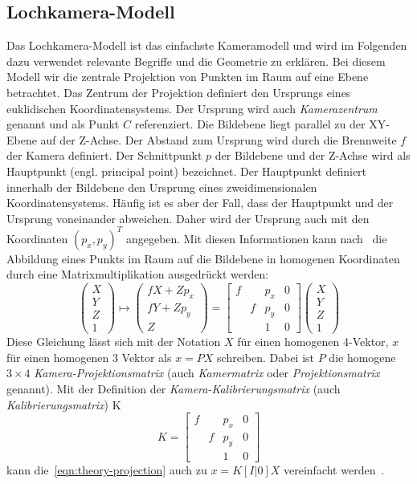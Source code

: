 \subsection{Lochkamera-Modell}\label{sec:pinhole-camera-model}
Das Lochkamera-Modell ist das einfachste Kameramodell und wird im Folgenden dazu verwendet relevante Begriffe und die Geometrie zu erklären.
Bei diesem Modell wir die zentrale Projektion von Punkten im Raum auf eine Ebene betrachtet.
Das Zentrum der Projektion definiert den Ursprungs eines euklidischen Koordinatensystems.
Der Ursprung wird auch \emph{Kamerazentrum} genannt und als Punkt $C$ referenziert.
Die Bildebene liegt parallel zu der XY-Ebene auf der Z-Achse.
Der Abstand zum Ursprung wird durch die Brennweite $f$ der Kamera definiert.
Der Schnittpunkt $p$ der Bildebene und der Z-Achse wird als Hauptpunkt (engl. principal point) bezeichnet.
Der Hauptpunkt definiert innerhalb der Bildebene den Ursprung eines zweidimensionalen Koordinatensystems.
Häufig ist es aber der Fall, dass der Hauptpunkt und der Ursprung voneinander abweichen.
Daher wird der Ursprung auch mit den Koordinaten $(p_x, p_y)^T$ angegeben.
Mit diesen Informationen kann nach~\cite[Gleichung 6.2]{hartley_2003} die Abbildung eines Punkts im Raum auf die Bildebene in homogenen Koordinaten durch eine Matrixmultiplikation ausgedrückt werden:
\begin{equation}
\label{eqn:theory-projection}
\begin{pmatrix}
    X \\ Y \\ Z \\ 1
\end{pmatrix}
\mapsto
\begin{pmatrix}
    fX+Zp_x \\ fY+Zp_y \\ Z
\end{pmatrix}
=
\begin{bmatrix}
    f &   & p_x & 0 \\
      & f & p_y & 0 \\
      &   & 1   & 0
\end{bmatrix}
\begin{pmatrix}
    X \\ Y \\ Z \\ 1
\end{pmatrix}
\end{equation}
Diese Gleichung lässt sich mit der Notation $X$ für einen homogenen 4-Vektor, $x$ für einen homogenen 3 Vektor als $x = PX$ schreiben.
Dabei ist $P$ die homogene $3\times 4$ \emph{Kamera-Projektionsmatrix} (auch \emph{Kamermatrix} oder \emph{Projektionsmatrix} genannt).
Mit der Definition der \emph{Kamera-Kalibrierungsmatrix} (auch \emph{Kalibrierungsmatrix}) K
\[
    K=
    \begin{bmatrix}
    f &   & p_x & 0 \\
      & f & p_y & 0 \\
      &   & 1   & 0
    \end{bmatrix}
\]
kann die~\ref{eqn:theory-projection} auch zu $x=K[I | 0] X$ vereinfacht werden~\cite[vgl. Gleichung 6.5]{hartley_2003}. 


